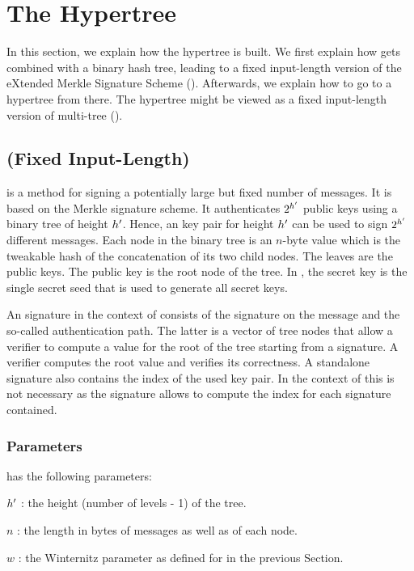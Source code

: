 \section{The \spx Hypertree}
In this section, we explain how the \spx hypertree is built. We first
explain how \wotsp gets combined with a binary hash tree, leading to a
fixed input-length version of the eXtended Merkle Signature Scheme
(\xmss). Afterwards, we explain how to go to a hypertree from there.
The hypertree might be viewed as a fixed input-length version of
multi-tree \xmss (\xmssm).

\subsection{(Fixed Input-Length) \xmss}\label{sec:xmss}
   \xmss is a method for signing a potentially large but fixed number of
   messages.  It is based on the Merkle signature scheme. It authenticates
   $2^{h'}$ \wotsp public keys using a binary tree of height ${h'}$.
   Hence, an \xmss key pair for height ${h'}$ can be used to sign 
   $2^{h'}$ different messages.
   Each node in the binary tree is an $n$-byte value which is the tweakable hash
   of the concatenation of its two child nodes. The leaves are the \wotsp public
   keys. The \xmss public key is the root node of the tree. 
   In \spx, the \xmss 
   secret key is the single secret seed that is used to generate all \wotsp
   secret keys.

   An \xmss signature in the context of \spx consists of the
   \wotsp signature on the message and the so-called authentication path.
   The latter is a vector of tree nodes that allow a verifier to compute
   a value for the root of the tree starting from a \wotsp signature.  A
   verifier computes the root value and verifies its correctness. A standalone
   \xmss signature also contains the index of the used \wotsp key pair. In the 
   context of \spx this is not necessary as the \spx signature allows to 
   compute the index for each \xmss signature contained.

\subsubsection{\xmss Parameters}

\xmss has the following parameters:
\begin{description}
 \item  ${h'}$ : the height (number of levels - 1) of the tree.
 \item  $n$ : the length in bytes of messages as well as of each node.
 \item  $w$ : the Winternitz parameter as defined for \wotsp in the 
 previous Section. 
\end{description}

